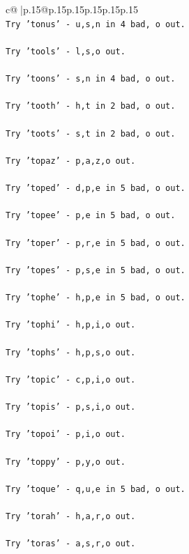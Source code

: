 \documentclass{article}
\begin{document}
{\begin{supertabular}{c@{$\;$}|p{.15\linewidth}@{}p{.15\linewidth}p{.15\linewidth}p{.15\linewidth}p{.15\linewidth}p{.15\linewidth}}
{{{\\ 
\texttt{Try 'tonus' {-} u,s,n in 4 bad, o out.} \\
\\ 
\texttt{Try 'tools' {-} l,s,o out.} \\
\\ 
\texttt{Try 'toons' {-} s,n in 4 bad, o out.} \\
\\ 
\texttt{Try 'tooth' {-} h,t in 2 bad, o out.} \\
\\ 
\texttt{Try 'toots' {-} s,t in 2 bad, o out.} \\
\\ 
\texttt{Try 'topaz' {-} p,a,z,o out.} \\
\\ 
\texttt{Try 'toped' {-} d,p,e in 5 bad, o out.} \\
\\ 
\texttt{Try 'topee' {-} p,e in 5 bad, o out.} \\
\\ 
\texttt{Try 'toper' {-} p,r,e in 5 bad, o out.} \\
\\ 
\texttt{Try 'topes' {-} p,s,e in 5 bad, o out.} \\
\\ 
\texttt{Try 'tophe' {-} h,p,e in 5 bad, o out.} \\
\\ 
\texttt{Try 'tophi' {-} h,p,i,o out.} \\
\\ 
\texttt{Try 'tophs' {-} h,p,s,o out.} \\
\\ 
\texttt{Try 'topic' {-} c,p,i,o out.} \\
\\ 
\texttt{Try 'topis' {-} p,s,i,o out.} \\
\\ 
\texttt{Try 'topoi' {-} p,i,o out.} \\
\\ 
\texttt{Try 'toppy' {-} p,y,o out.} \\
\\ 
\texttt{Try 'toque' {-} q,u,e in 5 bad, o out.} \\
\\ 
\texttt{Try 'torah' {-} h,a,r,o out.} \\
\\ 
\texttt{Try 'toras' {-} a,s,r,o out.} \\
\\ 
}}}
\end{supertabular}}
\end{document}
